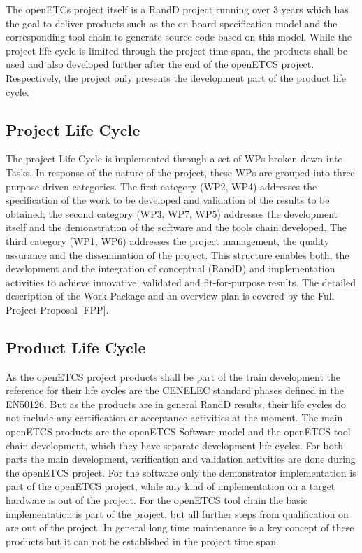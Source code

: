 \documentclass{template/openetcs_article}
\begin{document}
The openETCs project itself is a \gls{RandD} project running over 3 years which has the goal to deliver products such as the on-board specification model and the corresponding tool chain to generate source code based on this model. While the project life cycle is limited through the project time span, the products shall be used and also developed further after the end of the openETCS project. Respectively, the project only presents the development part of the product life cycle.

\subsection{Project Life Cycle }

The project Life Cycle is implemented through a set of WPs broken down into Tasks. In response of the nature of the project, these WPs are grouped into three purpose driven categories. The first category (WP2, WP4) addresses the specification of the work to be developed and validation of the results to be obtained; the second category (WP3, WP7, WP5) addresses the development itself and the demonstration of the software and the tools chain developed. The third category (WP1, WP6) addresses the project management, the quality assurance and the dissemination of the project.
This structure enables both, the development and the integration of conceptual (\gls{RandD}) and implementation activities to achieve innovative, validated and fit-for-purpose results.
The detailed description of the Work Package and an overview plan is covered by the Full Project Proposal [FPP].  


\subsection{Product Life Cycle }

As the openETCS project products shall be part of the train development the reference for their life cycles are the CENELEC standard phases defined in the EN50126. But as the products are in general \gls{RandD} results, their life cycles do not include any certification or acceptance activities at the moment. The main openETCS products are the openETCS Software model and the openETCS tool chain development, which they have separate development life cycles. For both parts the main development, verification and validation activities are done during the openETCS project. For the software only the demonstrator implementation is part of the openETCS project, while any kind of implementation on a target hardware is out of the project. 
For the openETCS tool chain the basic implementation is part of the project, but all further steps from qualification on are out of the project.
In general long time maintenance is a key concept of these products but it can not be established in the project time span. 
\end{document}
